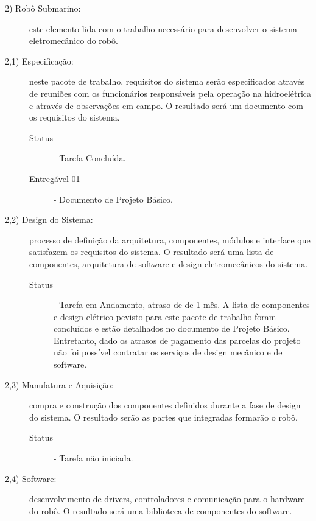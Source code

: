 \begin{description}

\vspace{0,5cm}

\item[ 2)  Robô Submarino:] este elemento lida com o trabalho necessário para desenvolver o sistema eletromecânico do robô. 

\item[2,1) Especificação:] neste pacote de trabalho, requisitos do sistema serão especificados através de reuniões com os funcionários responsáveis pela operação na hidroelétrica e através de observações em campo. O resultado será um documento com os requisitos do sistema.

\begin{description}
	\item [Status] - Tarefa Concluída. 
	\item [Entregável 01] - Documento de Projeto Básico. 
\end{description} 

\item[2,2) Design do Sistema:] processo de definição da arquitetura, componentes, módulos e interface que satisfazem os requisitos do sistema. O resultado será uma lista de componentes, arquitetura de software e design eletromecânicos do sistema.

\begin{description}
	\item [Status] - Tarefa em Andamento, atraso de de 1 mês. A lista de componentes e design elétrico pevisto para este pacote de trabalho foram concluídos e estão detalhados no documento de Projeto Básico. Entretanto, dado os atrasos de pagamento das parcelas do projeto não foi possível contratar os serviços de design mecânico e de software. 
\end{description} 

\item[2,3) Manufatura e Aquisição:] compra e construção dos componentes definidos durante a fase de design do sistema. O resultado serão as partes que integradas formarão o robô. 

\begin{description}
	\item [Status] - Tarefa não iniciada. 
\end{description} 

\item[2,4) Software:] desenvolvimento de drivers, controladores e comunicação para o hardware do robô. O resultado será uma biblioteca de componentes  do software.


\end{description}
